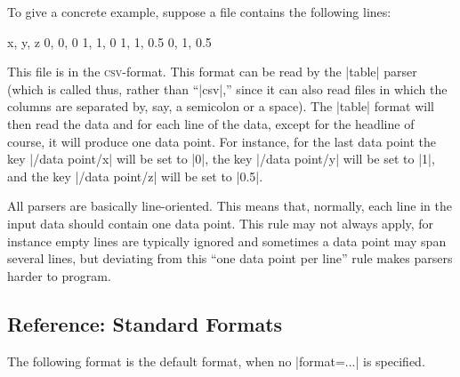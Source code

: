 To give a concrete example, suppose a file contains the following
lines:
\begin{codeexample}
x, y, z
0, 0, 0
1, 1, 0
1, 1, 0.5
0, 1, 0.5
\end{codeexample}
This file is in the \textsc{csv}-format. This format can be read by
the |table| parser (which is called thus, rather than ``|csv|,'' since
it can also read files in which the columns are separated by, say, a
semicolon or a space). The |table| format will then read the data and
for each line of the data, except for the headline of course, it will
produce one data point. For instance, for the last data point the key
|/data point/x| will be set to |0|, the key |/data point/y| will be
set to |1|, and the key |/data point/z| will be set to |0.5|.

All parsers are basically line-oriented. This means that, normally,
each line in the input data should contain one data point. This rule
may not always apply, for instance empty lines are typically ignored
and sometimes a data point may span several lines, but deviating from
this ``one data point per line'' rule makes parsers harder to
program. 


\subsection{Reference: Standard Formats}

The following format is the default format, when no |format=...| is
specified.

